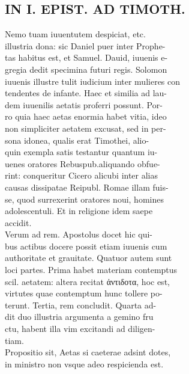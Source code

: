 \documentclass{article}
\begin{document}
\begin{pages}
\section*{IN I. EPIST. AD TIMOTH. \\
                }
Nemo tuam iuuentutem despiciat, etc. \\
                illustria dona: sic Daniel puer inter Prophe- \\
                tas habitus est, et Samuel. Dauid, iuuenis e- \\
                gregia dedit specimina futuri regis. Solomon \\
                iuuenis illustre tulit iudicium inter mulieres con \\
                tendentes de infante. Haec et similia ad lau- \\
                dem iuuenilis aetatis proferri possunt. Por- \\
                ro quia haec aetas enormia habet vitia, ideo \\
                non simpliciter aetatem excusat, sed in per- \\
                sona idonea, qualis erat Timothei, alio- \\
                quin exempla satis testantur quantum iu- \\
                uenes oratores Rebuspub.aliquando obfue- \\
                rint: conqueritur Cicero alicubi inter alias \\
                causas dissipatae Reipubl. Romae illam fuis- \\
                se, quod surrexerint oratores noui, homines \\
                adolescentuli. Et in religione idem saepe \\
                accidit. \\
                Verum ad rem. Apostolus docet hic qui- \\
                bus actibus docere possit etiam iuuenis cum \\
                authoritate et grauitate. Quatuor autem sunt \\
                loci partes. Prima habet materiam contemptus \\
                scil. aetatem: altera recitat ἀντιδοτα, hoc est, \\
                virtutes quae contemptum hunc tollere po- \\
                terunt. Tertia, rem concludit. Quarta ad- \\
                dit duo illustria argumenta a gemino fru \\
                ctu, habent illa vim excitandi ad diligen- \\
                tiam. \\
                Propositio sit, Aetas si caeterae adsint dotes, \\
                in ministro non vsque adeo respicienda est. \\
                

\end{pages}
\end{document}
